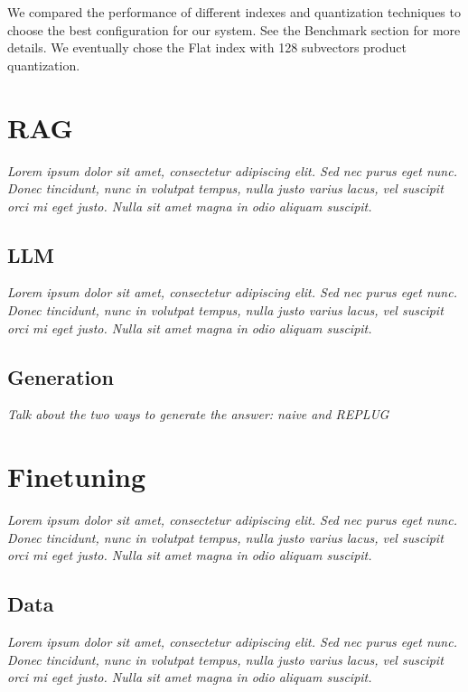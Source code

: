 \documentclass[11pt]{article}
\begin{document}
We compared the performance of different indexes and quantization techniques to choose the best
configuration for our system. See the Benchmark section for more details.
We eventually chose the Flat index with 128 subvectors product quantization.

\section{RAG}

\textit{Lorem ipsum dolor sit amet, consectetur adipiscing elit. Sed nec purus eget
nunc. Donec tincidunt, nunc in volutpat tempus, nulla justo varius lacus, vel
suscipit orci mi eget justo. Nulla sit amet magna in odio aliquam suscipit.}

\subsection{LLM}

\textit{Lorem ipsum dolor sit amet, consectetur adipiscing elit. Sed nec purus eget
nunc. Donec tincidunt, nunc in volutpat tempus, nulla justo varius lacus, vel
suscipit orci mi eget justo. Nulla sit amet magna in odio aliquam suscipit.}

\subsection{Generation}

\textit{Talk about the two ways to generate the answer: naive and REPLUG}

\section{Finetuning}

\textit{Lorem ipsum dolor sit amet, consectetur adipiscing elit. Sed nec purus eget
nunc. Donec tincidunt, nunc in volutpat tempus, nulla justo varius lacus, vel
suscipit orci mi eget justo. Nulla sit amet magna in odio aliquam suscipit.}

\subsection{Data}

\textit{Lorem ipsum dolor sit amet, consectetur adipiscing elit. Sed nec purus eget
nunc. Donec tincidunt, nunc in volutpat tempus, nulla justo varius lacus, vel
suscipit orci mi eget justo. Nulla sit amet magna in odio aliquam suscipit.}
\end{document}
